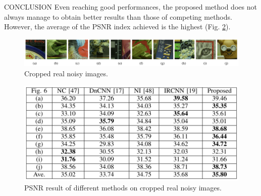 \begin{frame}{CONCLUSION}
    Even reaching good performances, the proposed method does not always 
    manage to obtain better results than those of competing methods. 
    However, the average of the PSNR index achieved is the highest (Fig. \ref{fig:cropRes}).
    \begin{figure}[h!]
        \centering
        \includegraphics[width = \linewidth]{images/paper7/crop.png}
        \centering
        \caption{Cropped real noisy images.}
        \label{fig:crop}
    \end{figure}
    
    \begin{figure}[h!]
        \centering
        \includegraphics[width = 0.6\linewidth]{images/paper7/crop result.png}
        \centering
        \caption{PSNR result of different methods on cropped real noisy images.}
        \label{fig:cropRes}
    \end{figure}
    
\end{frame}


